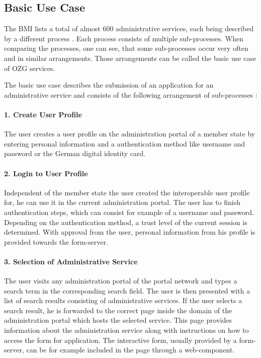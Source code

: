 \documentclass[
     12pt,         %
     a4paper,      %
     BCOR=10mm,version=first,     %
     DIV=14,version=first,        %
     ]{scrreprt}
\begin{document}
\subsection{Basic Use Case}
The BMI lists a total of almost 600 administrative services, each being described by a different process \cite{BMI:Informatiosplattform}. Each process consists of multiple sub-processes. When comparing the processes, one can see, that some sub-processes occur very often and in similar arrangements. Those arrangements can be called the basic use case of OZG services.

The basic use case describes the submission of an application for an administrative service and consists of the following arrangement of sub-processes \cite{NRW:Umsetzung}:

\paragraph{1. Create User Profile}
The user creates a user profile on the administration portal of a member state by entering personal information and a authentication method like username and password or the German digital identity card.

\paragraph{2. Login to User Profile}
Independent of the member state the user created the interoperable user profile for, he can use it in the current administration portal. The user has to finish authentication steps, which can consist for example of a username and password. Depending on the authentication method, a trust level of the current session is determined. With approval from the user, personal information from his profile is provided towards the form-server.

\paragraph{3. Selection of Administrative Service}
The user visits any administration portal of the portal network and types a search term in the corresponding search field. The user is then presented with a list of search results consisting of administrative services. If the user selects a search result, he is forwarded to the correct page inside the domain of the administration portal which hosts the selected service. This page provides information about the administration service along with instructions on how to access the form for application. The interactive form, usually provided by a form-server, can be for example included in the page through a web-component.
\end{document}
